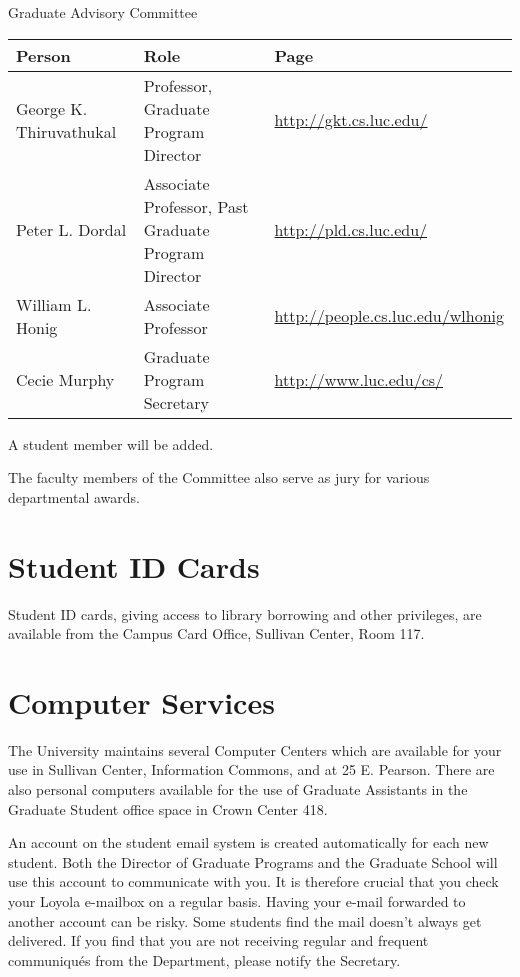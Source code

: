 \documentclass[letterpaper,10pt,english]{sphinxmanual}
\begin{document}
\begin{threeparttable}
\capstart\caption{Graduate Advisory Committee}

\begin{tabulary}{\linewidth}{|L|L|L|}
\hline
\textbf{
Person
} & \textbf{
Role
} & \textbf{
Page
}\\\hline

George K. Thiruvathukal
 & 
Professor, Graduate Program Director
 & 
\href{http://gkt.cs.luc.edu/}{http://gkt.cs.luc.edu/}
\\\hline

Peter L. Dordal
 & 
Associate Professor, Past Graduate Program Director
 & 
\href{http://pld.cs.luc.edu/}{http://pld.cs.luc.edu/}
\\\hline

William L. Honig
 & 
Associate Professor
 & 
\href{http://people.cs.luc.edu/wlhonig}{http://people.cs.luc.edu/wlhonig}
\\\hline

Cecie Murphy
 & 
Graduate Program Secretary
 & 
\href{http://www.luc.edu/cs/}{http://www.luc.edu/cs/}
\\\hline
\end{tabulary}

\end{threeparttable}


A student member will be added.

The faculty members of the Committee also serve as jury for various departmental awards.


\section{Student ID Cards}
\label{general:student-id-cards}
Student ID cards, giving access to library borrowing and other privileges, are available from the Campus Card Office, Sullivan Center, Room 117.


\section{Computer Services}
\label{general:computer-services}
The University maintains several Computer Centers which are available for your use in Sullivan Center, Information Commons, and at 25 E. Pearson. There are also personal computers available for the use of Graduate Assistants in the Graduate Student office space in Crown Center 418.

An account on the student email system is created automatically for each new student. Both the Director of Graduate Programs and the Graduate School will use this account to communicate with you. It is therefore crucial that you check your Loyola e-mailbox on a regular basis. Having your e-mail forwarded to another account can be risky. Some students find the mail doesn't always get delivered. If you find that you are not receiving regular and frequent communiqués from the Department, please notify the Secretary.
\end{document}
